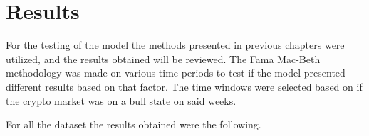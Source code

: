 \chapter{Results}
\label{c5}
For the testing of the model the methods presented in previous chapters were utilized, and the results obtained will be reviewed. The Fama Mac-Beth methodology was made on various time periods to test if the model presented different results based on that factor. The time windows were selected based on if the crypto market was on a bull state on said weeks.

For all the dataset the results obtained were the following.

